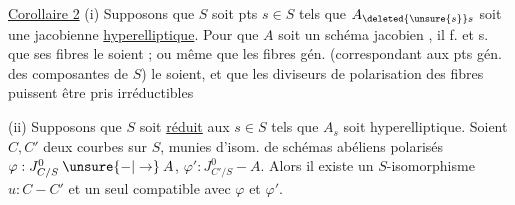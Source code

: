 


\uline{Corollaire 2} (i) Supposons que $S$ soit  \uline{}   pts $s\in S$ tels que $A_{\deleted{\unsure{s}}s}$ soit une jacobienne  \uline{hyperelliptique}. Pour que $A$ soit un schéma jacobien , il f. et s. que ses fibres le soient ; ou même que les fibres gén. (correspondant aux pts gén. des composantes de $S$) le soient, et que les diviseurs de polarisation des  fibres puissent être pris irréductibles

(ii) Supposons que $S$ soit \uline{réduit} aux  $s\in S$ tels que $A_s$ soit hyperelliptique. Soient $C,C'$ deux courbes sur $S$, munies d'isom. de schémas abéliens polarisés $\varphi:J^0_{C/S}\mathbin{\unsure{-|\to}}A$, $\varphi':J^0_{C'/S}-A$. Alors il existe un $S$-isomorphisme $u:C-C'$ et un seul  compatible avec $\varphi$ et $\varphi'$.

